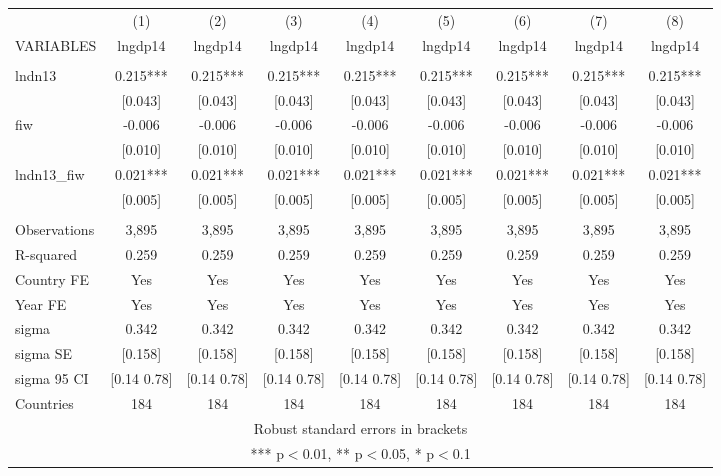 \documentclass[]{article}
\begin{document}
\begin{tabular}{lcccccccc} \hline
 & (1) & (2) & (3) & (4) & (5) & (6) & (7) & (8) \\
VARIABLES & lngdp14 & lngdp14 & lngdp14 & lngdp14 & lngdp14 & lngdp14 & lngdp14 & lngdp14 \\ \hline
 &  &  &  &  &  &  &  &  \\
lndn13 & 0.215*** & 0.215*** & 0.215*** & 0.215*** & 0.215*** & 0.215*** & 0.215*** & 0.215*** \\
 & [0.043] & [0.043] & [0.043] & [0.043] & [0.043] & [0.043] & [0.043] & [0.043] \\
fiw & -0.006 & -0.006 & -0.006 & -0.006 & -0.006 & -0.006 & -0.006 & -0.006 \\
 & [0.010] & [0.010] & [0.010] & [0.010] & [0.010] & [0.010] & [0.010] & [0.010] \\
lndn13\_fiw & 0.021*** & 0.021*** & 0.021*** & 0.021*** & 0.021*** & 0.021*** & 0.021*** & 0.021*** \\
 & [0.005] & [0.005] & [0.005] & [0.005] & [0.005] & [0.005] & [0.005] & [0.005] \\
 &  &  &  &  &  &  &  &  \\
Observations & 3,895 & 3,895 & 3,895 & 3,895 & 3,895 & 3,895 & 3,895 & 3,895 \\
R-squared & 0.259 & 0.259 & 0.259 & 0.259 & 0.259 & 0.259 & 0.259 & 0.259 \\
Country FE & Yes & Yes & Yes & Yes & Yes & Yes & Yes & Yes \\
Year FE & Yes & Yes & Yes & Yes & Yes & Yes & Yes & Yes \\
sigma & 0.342 & 0.342 & 0.342 & 0.342 & 0.342 & 0.342 & 0.342 & 0.342 \\
sigma SE & [0.158] & [0.158] & [0.158] & [0.158] & [0.158] & [0.158] & [0.158] & [0.158] \\
sigma 95 CI & [0.14 0.78] & [0.14 0.78] & [0.14 0.78] & [0.14 0.78] & [0.14 0.78] & [0.14 0.78] & [0.14 0.78] & [0.14 0.78] \\
 Countries & 184 & 184 & 184 & 184 & 184 & 184 & 184 & 184 \\ \hline
\multicolumn{9}{c}{ Robust standard errors in brackets} \\
\multicolumn{9}{c}{ *** p$<$0.01, ** p$<$0.05, * p$<$0.1} \\
\end{tabular}
\end{document}
